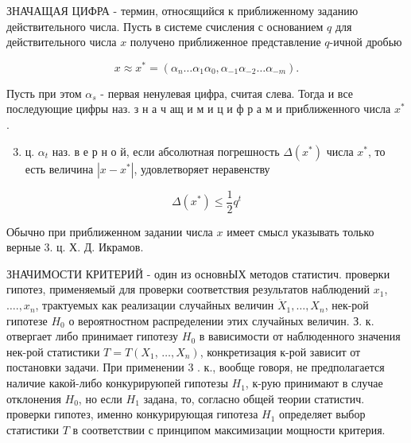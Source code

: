 \documentclass[10pt]{article}
\begin{document}
ЗНАЧАЩАЯ ЦИФРА - термин, относящийся к приближенному заданию действительного числа. Пусть в системе счисления с основанием $q$ для действительного числа $x$ получено приближенное представление $q$-ичной дробью



\[

x \approx x^{*}=\left(\alpha_{n} \ldots \alpha_{1} \alpha_{0}, \alpha_{-1} \alpha_{-2} \ldots \alpha_{-m}\right) .

\]



Пусть при этом $\alpha_{s}$ - первая ненулевая цифра, считая слева. Тогда и все последующие цифры наз. з н а ч ащ и м и ц и ф р а м и приближенного числа $x^{*}$.



\begin{enumerate}

  \setcounter{enumi}{2}

  \item ц. $\alpha_{t}$ наз. в е р н о й, если абсолютная погрешность $\Delta\left(x^{*}\right)$ числа $x^{*}$, то есть величина $\left|x-x^{*}\right|$, удовлетворяет неравенству

\end{enumerate}



\[

\Delta\left(x^{*}\right) \leqslant \frac{1}{2} q^{t}

\]



Обычно при приближенном задании числа $x$ имеет смысл указывать только верные 3. ц. Х. Д. Икрамов.



ЗНАЧИМОСТИ КРИТЕРИЙ - один из основнЫХ методов статистич. проверки гипотез, применяемый для проверки соответствия результатов наблюдений $x_{1}$, $\ldots ., x_{n}$, трактуемых как реализации случайных величин $\ddot{X}_{1}, \ldots, X_{n}$, нек-рой гипотезе $H_{0}$ о вероятностном распределении этих случайных величин. З. к. отвергает либо принимает гипотезу $H_{0}$ в вависимости от наблюденного значения нек-рой статистики $T=T\left(X_{1}\right.$, $\left.\ldots, X_{n}\right)$, конкретизация к-рой зависит от постановки задачи. При применении 3 . к., вообще говоря, не предполагается наличие какой-либо конкурируюпей гипотезы $H_{1}$, к-рую принимают в случае отклонения $H_{0}$, но если $H_{1}$ задана, то, согласно общей теории статистич. проверки гипотез, именно конкурирующая гипотеза $H_{1}$ определяет выбор статистики $T$ в соответствии с принципом максимизации мощности критерия.
\end{document}
